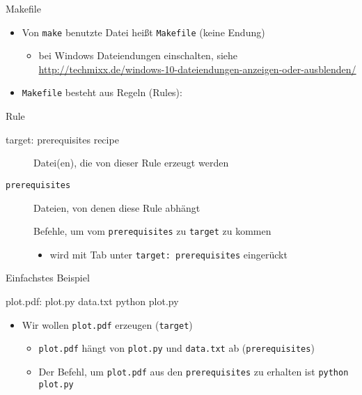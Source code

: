 \begin{frame}[fragile]{Makefile}
  \begin{itemize}
    \item Von \texttt{make} benutzte Datei heißt \texttt{Makefile} (keine Endung)
      \begin{itemize}
        \item bei Windows Dateiendungen einschalten, siehe 
          \url{http://techmixx.de/windows-10-dateiendungen-anzeigen-oder-ausblenden/}
      \end{itemize}
    \item \texttt{Makefile} besteht aus Regeln (Rules):
  \end{itemize}
  \begin{block}{Rule}
    \centering
    \begin{lstmake}
      target: prerequisites
          recipe
    \end{lstmake}
  \end{block}
  \begin{description}
    \item[\texttt{\hphantom{prerequisites}}] Datei(en), die von dieser Rule erzeugt werden
    \item[\texttt{prerequisites}]                         Dateien, von denen diese Rule abhängt
    \item[\texttt{\hphantom{prerequisites}}] Befehle, um vom \texttt{prerequisites} zu \texttt{target} zu kommen
    \begin{itemize}
      \item wird mit Tab unter \texttt{target: prerequisites} eingerückt
    \end{itemize}
  \end{description}
\end{frame}

\begin{frame}[fragile]{Einfachstes Beispiel}
  \begin{center}
    \begin{lstmake}
      plot.pdf: plot.py data.txt
          python plot.py
    \end{lstmake}
  \end{center}
  \begin{itemize}
    \item Wir wollen \texttt{plot.pdf} erzeugen (\texttt{target})
    \begin{itemize}
      \item \texttt{plot.pdf} hängt von \texttt{plot.py} und \texttt{data.txt} ab (\texttt{prerequisites})
      \item Der Befehl, um \texttt{plot.pdf} aus den \texttt{prerequisites} zu erhalten ist \texttt{python plot.py}
    \end{itemize}
  \end{itemize}
\end{frame}

